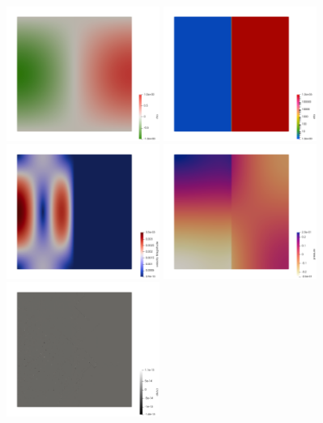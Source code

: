 \begin{center}
\includegraphics[width=5cm]{python_codes/fieldstone_158/results/exp3/rho}
\includegraphics[width=5cm]{python_codes/fieldstone_158/results/exp3/eta}\\
\includegraphics[width=5cm]{python_codes/fieldstone_158/results/exp3/vel}
\includegraphics[width=5cm]{python_codes/fieldstone_158/results/exp3/press}
\includegraphics[width=5cm]{python_codes/fieldstone_158/results/exp3/divv}
\end{center} 

